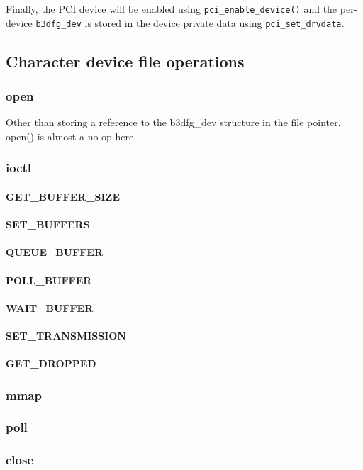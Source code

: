 \documentclass[12pt]{article}
\begin{document}
Finally, the PCI device will be enabled using \texttt{pci\_enable\_device()} and the per-device \texttt{b3dfg\_dev} is stored in the device private data using \texttt{pci\_set\_drvdata}.

\subsection{Character device file operations}

\subsubsection{open}

Other than storing a reference to the b3dfg\_dev structure in the file pointer, open() is almost a no-op here.

\subsubsection{ioctl}

\paragraph{GET\_BUFFER\_SIZE}

\paragraph{SET\_BUFFERS}

\paragraph{QUEUE\_BUFFER}

\paragraph{POLL\_BUFFER}

\paragraph{WAIT\_BUFFER}

\paragraph{SET\_TRANSMISSION}

\paragraph{GET\_DROPPED}

\subsubsection{mmap}

\subsubsection{poll}

\subsubsection{close}

\end{document}
